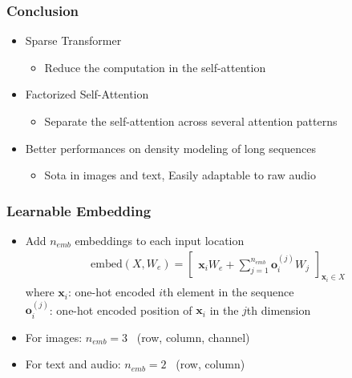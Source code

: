 \documentclass[dvipdfmx]{beamer}
\begin{document}
\begin{frame}
    \frametitle{Conclusion}
    \begin{itemize}
        \item Sparse Transformer
        \begin{itemize}
            \item Reduce the computation in the self-attention
        \end{itemize}
    \end{itemize}
    \begin{itemize}
        \item Factorized Self-Attention
        \begin{itemize}
            \item Separate the self-attention across several attention patterns
        \end{itemize}
    \end{itemize}
    \begin{itemize}
        \item Better performances on density modeling of long sequences
        \begin{itemize}
            \item Sota in images and text, Easily adaptable to raw audio
        \end{itemize}
    \end{itemize}
\end{frame}



\begin{frame}[noframenumbering]
    \frametitle{Learnable Embedding}
    \begin{itemize}
        \item Add $n_{emb}$ embeddings to each input location
            \begin{align*}
                \mathrm{embed}(X, W_e) = \begin{bmatrix} \displaystyle \bm{x}_i W_e + \sum_{j=1}^{n_{emb}} \bm{o}^{(j)}_{i} W_j \end{bmatrix}_{\bm{x}_i \in X}
            \end{align*}
            where $\bm{x}_i$: one-hot encoded $i$th element in the sequence \\
             $\bm{o}^{(j)}_{i}$: one-hot encoded position of $\bm{x}_i$ in the $j$th dimension %
    \end{itemize}
    \begin{itemize}
        \item For images: $n_{emb} = 3$ \ {\footnotesize (row, column, channel)}
        \item For text and audio: $n_{emb} = 2$ \ {\footnotesize (row, column)}
    \end{itemize}
\end{frame}
\end{document}
